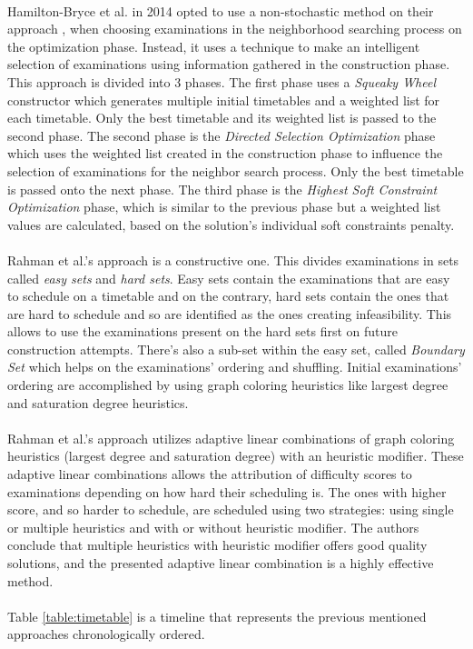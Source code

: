 \\
Hamilton-Bryce et al. \cite{Hamilton-Bryce2014} in 2014 opted to use a non-stochastic method on their approach \cite{Hamilton-Bryce2014}, when choosing examinations in the neighborhood searching process on the optimization phase. Instead, it uses a technique to make an intelligent selection of examinations using information gathered in the construction phase. This approach is divided into 3 phases. The first phase uses a \textit{Squeaky Wheel} constructor which generates multiple initial timetables and a weighted list for each timetable. Only the best timetable and its weighted list is passed to the second phase. The second phase is the \textit{Directed Selection Optimization} phase which uses the weighted list created in the construction phase to influence the selection of examinations for the neighbor search process. Only the best timetable is passed onto the next phase. The third phase is the \textit{Highest Soft Constraint Optimization} phase, which is similar to the previous phase but a weighted list values are calculated, based on the solution's individual soft constraints penalty.\\
\\
Rahman et al.'s approach \cite{Rahman2014} is a constructive one. This divides examinations in sets called \textit{easy sets} and \textit{hard sets}. Easy sets contain the examinations that are easy to schedule on a timetable and on the contrary, hard sets contain the ones that are hard to schedule and so are identified as the ones creating infeasibility. This allows to use the examinations present on the hard sets first on future construction attempts. There's also a sub-set within the easy set, called \textit{Boundary Set} which helps on the examinations' ordering and shuffling. Initial examinations' ordering  are accomplished by using graph coloring heuristics like largest degree and saturation degree heuristics.\\
\\
Rahman et al.'s approach \cite{Rahman2014a} utilizes adaptive linear combinations of graph coloring heuristics (largest degree and saturation degree) with an heuristic modifier. These adaptive linear combinations allows the attribution of difficulty scores to examinations depending on how hard their scheduling is. The ones with higher score, and so harder to schedule, are scheduled using two strategies: using single or multiple heuristics and with or without heuristic modifier. The authors conclude that multiple heuristics with heuristic modifier offers good quality solutions, and the presented adaptive linear combination is a highly effective method.\\
\\
Table \ref{table:timetable} is a timeline that represents the previous mentioned approaches chronologically ordered.


